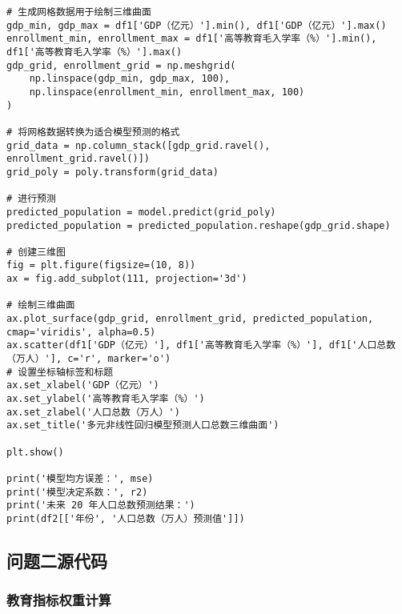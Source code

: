 \documentclass[withoutpreface,bwprint]{cumcmthesis} %
\begin{document}
\begin{verbatim}
# 生成网格数据用于绘制三维曲面
gdp_min, gdp_max = df1['GDP（亿元）'].min(), df1['GDP（亿元）'].max()
enrollment_min, enrollment_max = df1['高等教育毛入学率（%）'].min(), df1['高等教育毛入学率（%）'].max()
gdp_grid, enrollment_grid = np.meshgrid(
    np.linspace(gdp_min, gdp_max, 100),
    np.linspace(enrollment_min, enrollment_max, 100)
)

# 将网格数据转换为适合模型预测的格式
grid_data = np.column_stack([gdp_grid.ravel(), enrollment_grid.ravel()])
grid_poly = poly.transform(grid_data)

# 进行预测
predicted_population = model.predict(grid_poly)
predicted_population = predicted_population.reshape(gdp_grid.shape)

# 创建三维图
fig = plt.figure(figsize=(10, 8))
ax = fig.add_subplot(111, projection='3d')

# 绘制三维曲面
ax.plot_surface(gdp_grid, enrollment_grid, predicted_population, cmap='viridis', alpha=0.5)
ax.scatter(df1['GDP（亿元）'], df1['高等教育毛入学率（%）'], df1['人口总数（万人）'], c='r', marker='o')
# 设置坐标轴标签和标题
ax.set_xlabel('GDP（亿元）')
ax.set_ylabel('高等教育毛入学率（%）')
ax.set_zlabel('人口总数（万人）')
ax.set_title('多元非线性回归模型预测人口总数三维曲面')

plt.show()

print('模型均方误差：', mse)
print('模型决定系数：', r2)
print('未来 20 年人口总数预测结果：')
print(df2[['年份', '人口总数（万人）预测值']])
\end{verbatim}

\subsection{问题二源代码}

\subsubsection{教育指标权重计算}
\end{document}
